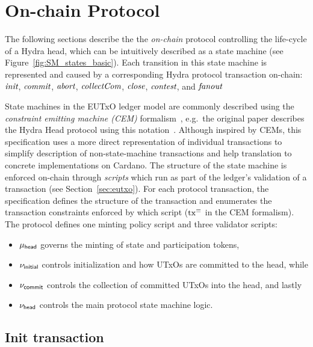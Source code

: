 \section{On-chain Protocol}\label{sec:on-chain}


The following sections describe the the \emph{on-chain} protocol controlling the
life-cycle of a Hydra head, which can be intuitively described as a state
machine (see Figure~\ref{fig:SM_states_basic}). Each transition in this state
machine is represented and caused by a corresponding Hydra protocol transaction
on-chain: $\textit{init}{}$, $\textit{commit}{}$, $\textit{abort}{}$, $\textit{collectCom}{}$,
$\textit{close}{}$, $\textit{contest}{}$, and $\textit{fanout}{}$

State machines in the EUTxO ledger model are commonly described using the
\emph{constraint emitting machine (CEM)} formalism~\cite{eutxo}, e.g.~the
original paper describes the Hydra Head protocol using this
notation~\cite{hydrahead20}. Although inspired by CEMs, this specification uses
a more direct representation of individual transactions to simplify description
of non-state-machine transactions and help translation to concrete
implementations on Cardano. The structure of the state machine is enforced
on-chain through \emph{scripts} which run as part of the ledger's validation of
a transaction (see Section~\ref{sec:eutxo}). For each protocol transaction, the
specification defines the structure of the transaction and enumerates the
transaction constraints enforced by which script ($\mathrm{tx}^\equiv$ in the CEM
formalism). \\

\noindent The protocol defines one minting policy script and three validator scripts:
\begin{itemize}
	\item $\mu_\mathsf{head}$ governs the minting of state and participation tokens,
	\item $\nu_{\mathsf{initial}}$ controls initialization and how UTxOs are committed to the head, while
	\item $\nu_{\mathsf{commit}}$ controls the collection of committed UTxOs into the head, and lastly
	\item $\nu_\mathsf{head}$ controls the main protocol state machine logic.
\end{itemize}

\subsection{Init transaction}\label{sec:init-tx}


